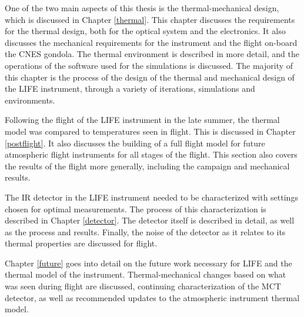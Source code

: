 One of the two main aspects of this thesis is the thermal-mechanical design, which is discussed in Chapter \ref{thermal}. This chapter discusses the requirements for the thermal design, both for the optical system and the electronics. It also discusses the mechanical requirements for the instrument and the flight on-board the CNES gondola. The thermal environment is described in more detail, and the operations of the software used for the simulations is discussed. The majority of this chapter is the process of the design of the thermal and mechanical design of the LIFE instrument, through a variety of iterations, simulations and environments.

Following the flight of the LIFE instrument in the late summer, the thermal model was compared to temperatures seen in flight. This is discussed in Chapter \ref{postflight}. It also discusses the building of a full flight model for future atmospheric flight instruments for all stages of the flight. This section also covers the results of the flight more generally, including the campaign and mechanical results.

The IR detector in the LIFE instrument needed to be characterized with settings chosen for optimal measurements. The process of this characterization is described in Chapter \ref{detector}. The detector itself is described in detail, as well as the process and results. Finally, the noise of the detector as it relates to its thermal properties are discussed for flight.

Chapter \ref{future} goes into detail on the future work necessary for LIFE and the thermal model of the instrument. Thermal-mechanical changes based on what was seen during flight are discussed, continuing characterization of the MCT detector, as well as recommended updates to the atmospheric instrument thermal model.